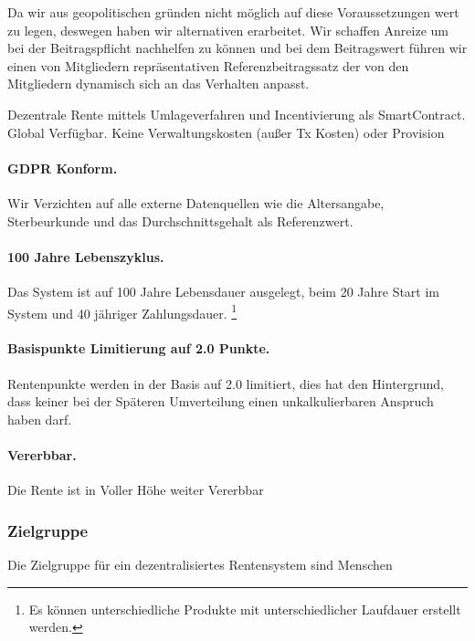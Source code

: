 Da wir aus geopolitischen gründen nicht möglich auf diese Voraussetzungen wert zu legen, deswegen haben wir alternativen erarbeitet.
Wir schaffen Anreize um bei der Beitragspflicht nachhelfen zu können und bei dem Beitragswert führen wir einen von Mitgliedern repräsentativen Referenzbeitragssatz der von den Mitgliedern dynamisch sich an das Verhalten anpasst.

Dezentrale Rente mittels Umlageverfahren und Incentivierung als SmartContract.
Global Verfügbar. Keine Verwaltungskosten (außer Tx Kosten) oder Provision

\paragraph{GDPR\cite{gdpr} Konform.} Wir Verzichten auf alle externe Datenquellen wie die Altersangabe, Sterbeurkunde und das Durchschnittsgehalt als Referenzwert.

\paragraph{100 Jahre Lebenszyklus.} Das System ist auf 100 Jahre Lebensdauer ausgelegt, beim 20 Jahre Start im System und 40 jähriger Zahlungsdauer. \footnote{ Es können unterschiedliche Produkte mit unterschiedlicher Laufdauer erstellt werden.} 

\paragraph{Basispunkte Limitierung auf 2.0 Punkte.} Rentenpunkte werden in der Basis auf 2.0 limitiert, dies hat den Hintergrund, dass keiner bei der Späteren Umverteilung einen unkalkulierbaren Anspruch haben darf.

\paragraph{Vererbbar.} Die Rente ist in Voller Höhe weiter Vererbbar


\subsubsection*{Zielgruppe}
Die Zielgruppe für ein dezentralisiertes Rentensystem sind Menschen

